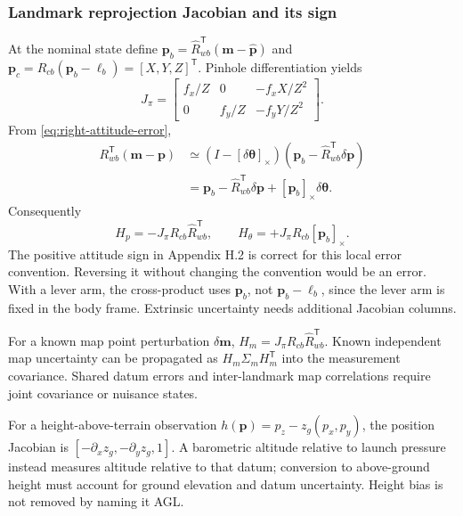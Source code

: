 \documentclass[11pt,a4paper]{article}
\numberwithin{equation}{section}
\begin{document}
\subsubsection{Landmark reprojection Jacobian and its sign}

At the nominal state define
$\boldsymbol p_b=\widehat R_{wb}^{\mathsf T}(\boldsymbol m-
\widehat{\boldsymbol p})$ and
$\boldsymbol p_c=R_{cb}(\boldsymbol p_b-\boldsymbol\ell_b)
=[X,Y,Z]^{\mathsf T}$. Pinhole differentiation yields
\begin{equation}
 J_\pi=\begin{bmatrix}f_x/Z&0&-f_xX/Z^2\\
                        0&f_y/Z&-f_yY/Z^2\end{bmatrix}.
\end{equation}
From \eqref{eq:right-attitude-error},
\begin{align}
 R_{wb}^{\mathsf T}(\boldsymbol m-\boldsymbol p)
 &\simeq(I-[\delta\boldsymbol\theta]_\times)
          (\boldsymbol p_b-\widehat R_{wb}^{\mathsf T}\delta\boldsymbol p)\\
 &=\boldsymbol p_b-\widehat R_{wb}^{\mathsf T}\delta\boldsymbol p
                  +[\boldsymbol p_b]_\times\delta\boldsymbol\theta.
\end{align}
Consequently
\begin{equation}
 H_p=-J_\pi R_{cb}\widehat R_{wb}^{\mathsf T},\qquad
 H_\theta=\boxed{+J_\pi R_{cb}[\boldsymbol p_b]_\times}.
 \label{eq:reprojection-jacobian}
\end{equation}
The positive attitude sign in Appendix H.2 is correct for this local
error convention. Reversing it without changing the convention would
be an error. With a lever arm, the cross-product uses $\boldsymbol p_b$,
not $\boldsymbol p_b-\boldsymbol\ell_b$, since the lever arm is fixed in
the body frame. Extrinsic uncertainty needs additional Jacobian columns.

For a known map point perturbation $\delta\boldsymbol m$,
$H_m=J_\pi R_{cb}\widehat R_{wb}^{\mathsf T}$. Known independent map
uncertainty can be propagated as $H_m\Sigma_m H_m^{\mathsf T}$ into the
measurement covariance. Shared datum errors and inter-landmark map
correlations require joint covariance or nuisance states.

For a height-above-terrain observation
$h(\boldsymbol p)=p_z-z_g(p_x,p_y)$, the position Jacobian is
$[-\partial_xz_g,-\partial_yz_g,1]$. A barometric altitude relative to
launch pressure instead measures altitude relative to that datum;
conversion to above-ground height must account for ground elevation
and datum uncertainty. Height bias is not removed by naming it AGL.
\end{document}
